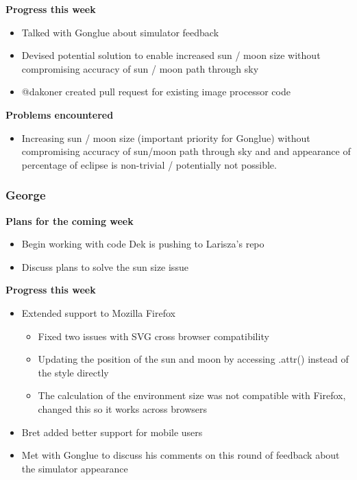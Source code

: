 \documentclass[10pt, onecolumn, draftclsnofoot, letterpaper, compsoc]{IEEEtran}
\begin{document}
    \noindent \textbf{Progress this week}

    \begin{itemize}

    \item Talked with Gonglue about simulator feedback
    \item Devised potential solution to enable increased sun / moon size without compromising accuracy of
      sun / moon path through sky
    \item @dakoner created pull request for existing image processor code

    \end{itemize}

    \noindent \textbf{Problems encountered}

    \begin{itemize}

    \item Increasing sun / moon size (important priority for Gonglue) without compromising accuracy of sun/moon
      path through sky and and appearance of percentage of eclipse is non-trivial / potentially not possible.

    \end{itemize}

    \subsubsection{George}

    \noindent \textbf{Plans for the coming week}

    \begin{itemize}

    \item Begin working with code Dek is pushing to Larisza's repo
    \item Discuss plans to solve the sun size issue

    \end{itemize}

    \noindent \textbf{Progress this week}

    \begin{itemize}

    \item Extended support to Mozilla Firefox

    \begin{itemize}
      \item Fixed two issues with SVG cross browser compatibility
      \item Updating the position of the sun and moon by accessing .attr() instead of the style directly
      \item The calculation of the environment size was not compatible with Firefox, changed this so it works across browsers
    \end{itemize}

    \item Bret added better support for mobile users
    \item Met with Gonglue to discuss his comments on this round of feedback about the simulator appearance

    \end{itemize}
\end{document}
